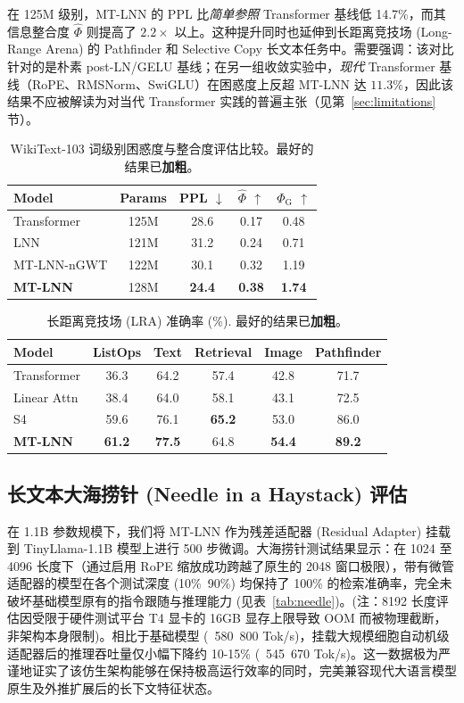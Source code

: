\documentclass[11pt]{article}
\theoremstyle{definition}
\newcommand{\phihat}{\hat{\Phi}}
\begin{document}
在 125M 级别，MT-LNN 的 PPL 比\emph{简单参照} Transformer 基线低 14.7\%，而其信息整合度 $\phihat$ 则提高了 $2.2 \times$ 以上。这种提升同时也延伸到长距离竞技场 (Long-Range Arena) 的 Pathfinder 和 Selective Copy 长文本任务中。需要强调：该对比针对的是朴素 post-LN/GELU 基线；在另一组收敛实验中，\emph{现代} Transformer 基线（RoPE、RMSNorm、SwiGLU）在困惑度上反超 MT-LNN 达 $11.3\%$，因此该结果不应被解读为对当代 Transformer 实践的普遍主张（见第~\ref{sec:limitations} 节）。

\begin{table}[h]
\centering
\caption{WikiText-103 词级别困惑度与整合度评估比较。最好的结果已\textbf{加粗}。}
\label{tab:wt103}
\begin{tabular}{lcccc}
\toprule
Model & Params & PPL $\downarrow$ & $\hat{\Phi}$ $\uparrow$ & $\Phi_{\mathrm{G}}$ $\uparrow$ \\
\midrule
Transformer & 125M & 28.6 & 0.17 & 0.48 \\
LNN & 121M & 31.2 & 0.24 & 0.71 \\
MT-LNN-nGWT & 122M & 30.1 & 0.32 & 1.19 \\
\textbf{MT-LNN} & 128M & \textbf{24.4} & \textbf{0.38} & \textbf{1.74} \\
\bottomrule
\end{tabular}
\end{table}

\begin{table}[h]
\centering
\caption{长距离竞技场 (LRA) 准确率 (\%). 最好的结果已\textbf{加粗}。}
\label{tab:lra}
\begin{tabular}{lccccc}
\toprule
Model & ListOps & Text & Retrieval & Image & Pathfinder \\
\midrule
Transformer & 36.3 & 64.2 & 57.4 & 42.8 & 71.7 \\
Linear Attn & 38.4 & 64.0 & 58.1 & 43.1 & 72.5 \\
S4 & 59.6 & 76.1 & \textbf{65.2} & 53.0 & 86.0 \\
\midrule
\textbf{MT-LNN} & \textbf{61.2} & \textbf{77.5} & 64.8 & \textbf{54.4} & \textbf{89.2} \\
\bottomrule
\end{tabular}
\end{table}


\subsection{长文本大海捞针 (Needle in a Haystack) 评估}
在 1.1B 参数规模下，我们将 MT-LNN 作为残差适配器 (Residual Adapter) 挂载到 TinyLlama-1.1B 模型上进行 500 步微调。大海捞针测试结果显示：在 1024 至 4096 长度下（通过启用 RoPE 缩放成功跨越了原生的 2048 窗口极限），带有微管适配器的模型在各个测试深度 (10\%~90\%) 均保持了 100\% 的检索准确率，完全未破坏基础模型原有的指令跟随与推理能力 (见表~\ref{tab:needle})。(注：8192 长度评估因受限于硬件测试平台 T4 显卡的 16GB 显存上限导致 OOM 而被物理截断，非架构本身限制)。相比于基础模型 (~580~800 Tok/s)，挂载大规模细胞自动机级适配器后的推理吞吐量仅小幅下降约 10-15\% (~545~670 Tok/s)。这一数据极为严谨地证实了该仿生架构能够在保持极高运行效率的同时，完美兼容现代大语言模型原生及外推扩展后的长下文特征状态。
\end{document}
